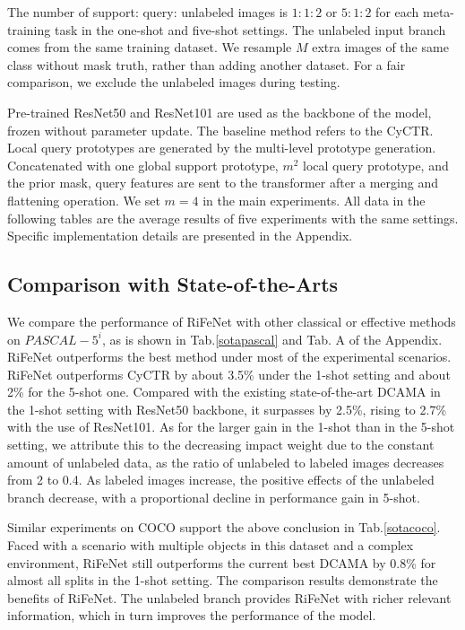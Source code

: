 \documentclass[letterpaper]{article} %
\begin{document}
The number of support: query: unlabeled images is $1:1:2$ or $5:1:2$ for each meta-training task in the one-shot and five-shot settings. The unlabeled input branch comes from the same training dataset. We resample $M$ extra images of the same class without mask truth, rather than adding another dataset. For a fair comparison, we exclude the unlabeled images during testing.

Pre-trained ResNet50 and ResNet101 \cite{he2016deep} are used as the backbone of the model, frozen without parameter update. The baseline method refers to the CyCTR.
Local query prototypes are generated by the multi-level prototype generation. Concatenated with one global support prototype, $m^2$ local query prototype, and the prior mask, query features are sent to the transformer after a merging and flattening operation. We set $m=4$ in the main experiments. All data in the following tables are the average results of five experiments with the same settings. Specific implementation details are presented in the Appendix.


\subsection{Comparison with State-of-the-Arts}
We compare the performance of RiFeNet with other classical or effective methods on $PASCAL-5^i$, as is shown in Tab.\ref{sotapascal} and Tab. A of the Appendix. RiFeNet outperforms the best method under most of the experimental scenarios. RiFeNet outperforms CyCTR by about 3.5\% under the 1-shot setting and about 2\% for the 5-shot one. Compared with the existing state-of-the-art DCAMA in the 1-shot setting with ResNet50 backbone, it surpasses by 2.5\%, rising to 2.7\% with the use of ResNet101. As for the larger gain in the 1-shot than in the 5-shot setting, we attribute this to the decreasing impact weight due to the constant amount of unlabeled data, as the ratio of unlabeled to labeled images decreases from 2 to 0.4. As labeled images increase, the positive effects of the unlabeled branch decrease, with a proportional decline in performance gain in 5-shot.

Similar experiments on COCO support the above conclusion in Tab.\ref{sotacoco}. Faced with a scenario with multiple objects in this dataset and a complex environment, RiFeNet still outperforms the current best DCAMA by 0.8\% for almost all splits in the 1-shot setting. The comparison results demonstrate the benefits of RiFeNet. The unlabeled branch provides RiFeNet with richer relevant information, which in turn improves the performance of the model.
\end{document}
